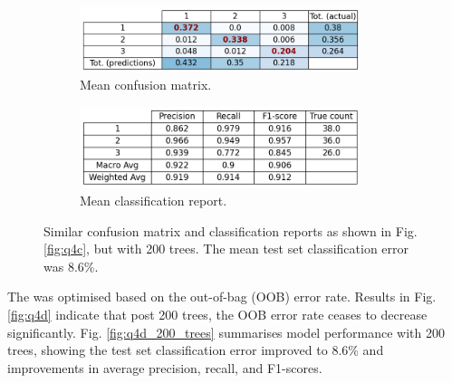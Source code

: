     \begin{figure}[htb]
    \centering
    \begin{subfigure}{0.5\textwidth}
        \centering
        \includegraphics[width=0.9\textwidth]{./figures/q4d_confusion_matrix_200_trees}
        \caption{Mean confusion matrix.}
        \label{fig:q4d_confusion_matrix_200_trees}
    \end{subfigure}%
    \begin{subfigure}{0.5\textwidth}
        \centering
        \includegraphics[width=0.9\textwidth]{./figures/q4d_classification_report_200_trees}
        \caption{Mean classification report.}
        \label{fig:q4d_classification_report_200_trees}
    \end{subfigure}
    \caption{Similar confusion matrix and classification reports as shown in Fig. \eqref{fig:q4c}, but with 200 trees.
        The mean test set classification error was 8.6\%.}
    \label{fig:q4d_200_trees}
    \end{figure}

    The  was optimised based on the out-of-bag (OOB) error rate.
    Results in Fig. \eqref{fig:q4d} indicate that post 200 trees, the OOB error rate ceases to decrease significantly.
    Fig. \eqref{fig:q4d_200_trees} summarises model performance with 200 trees, showing the test set classification error
    improved to 8.6\% and improvements in average precision, recall, and F1-scores.

